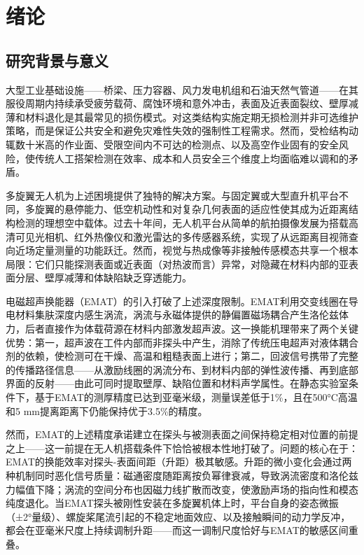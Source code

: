 \chapter{绪\hspace{6pt}论}

\section{研究背景与意义}

大型工业基础设施——桥梁、压力容器、风力发电机组和石油天然气管道——在其服役周期内持续承受疲劳载荷、腐蚀环境和意外冲击，表面及近表面裂纹、壁厚减薄和材料退化是其最常见的损伤模式。对这类结构实施定期无损检测并非可选维护策略，而是保证公共安全和避免灾难性失效的强制性工程需求。然而，受检结构动辄数十米高的作业面、受限空间内不可达的检测点、以及高空作业固有的安全风险，使传统人工搭架检测在效率、成本和人员安全三个维度上均面临难以调和的矛盾。

多旋翼无人机为上述困境提供了独特的解决方案。与固定翼或大型直升机平台不同，多旋翼的悬停能力、低空机动性和对复杂几何表面的适应性使其成为近距离结构检测的理想空中载体。过去十年间，无人机平台从简单的航拍摄像发展为搭载高清可见光相机、红外热像仪和激光雷达的多传感器系统，实现了从远距离目视筛查向近场定量测量的功能跃迁。然而，视觉与热成像等非接触传感模态共享一个根本局限：它们只能探测表面或近表面（对热波而言）异常，对隐藏在材料内部的亚表面分层、壁厚减薄和体缺陷缺乏穿透能力。

电磁超声换能器（EMAT）的引入打破了上述深度限制。EMAT利用交变线圈在导电材料集肤深度内感生涡流，涡流与永磁体提供的静偏置磁场耦合产生洛伦兹体力，后者直接作为体载荷源在材料内部激发超声波。这一换能机理带来了两个关键优势：第一，超声波在工件内部而非探头中产生，消除了传统压电超声对液体耦合剂的依赖，使检测可在干燥、高温和粗糙表面上进行；第二，回波信号携带了完整的传播路径信息——从激励线圈的涡流分布、到材料内部的弹性波传播、再到底部界面的反射——由此可同时提取壁厚、缺陷位置和材料声学属性。在静态实验室条件下，基于EMAT的测厚精度已达到亚毫米级，测量误差低于1\%，且在500°C高温和5 mm提离距离下仍能保持优于3.5\%的精度。

然而，EMAT的上述精度承诺建立在探头与被测表面之间保持稳定相对位置的前提之上——这一前提在无人机搭载条件下恰恰被根本性地打破了。问题的核心在于：EMAT的换能效率对探头-表面间距（升距）极其敏感。升距的微小变化会通过两种机制同时恶化信号质量：磁通密度随距离按负幂律衰减，导致涡流密度和洛伦兹力幅值下降；涡流的空间分布也因磁力线扩散而改变，使激励声场的指向性和模态纯度退化。当EMAT探头被刚性安装在多旋翼机体上时，平台自身的姿态微振（±2°量级）、螺旋桨尾流引起的不稳定地面效应、以及接触瞬间的动力学反冲，都会在亚毫米尺度上持续调制升距——而这一调制尺度恰好与EMAT的敏感区间重叠。

